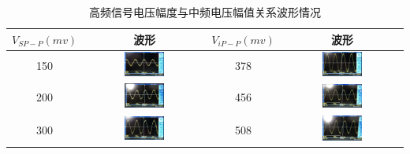 \documentclass[12pt]{article}%
\numberwithin{equation}{section}
\begin{document}
\begin{enumerate}
\begin{table}[htbp]
\centering
\caption{高频信号电压幅度与中频电压幅值关系波形情况}
\label{tab:ajk2}
\begin{tabular}{|c|c|c|c|}
\hline
$V_{SP-P}(mv)$ & 波形 & $V_{iP-P}(mv)$ & 波形 \\\hline
150            &   \includegraphics[width=0.35\textwidth]{gaopin3/gaopin310.jpg} & 378            &    \includegraphics[width=0.35\textwidth]{gaopin3/gaopin318.jpg}\\\hline
200            & \includegraphics[width=0.35\textwidth]{gaopin3/gaopin315.jpg}   & 456            & \includegraphics[width=0.35\textwidth]{gaopin3/gaopin317.jpg} \\\hline
300            &  \includegraphics[width=0.35\textwidth]{gaopin3/gaopin313.jpg}  & 508            & \includegraphics[width=0.35\textwidth]{gaopin3/gaopin309.jpg}  \\\hline

\end{tabular}
\end{table}
\end{enumerate}
\end{document}
